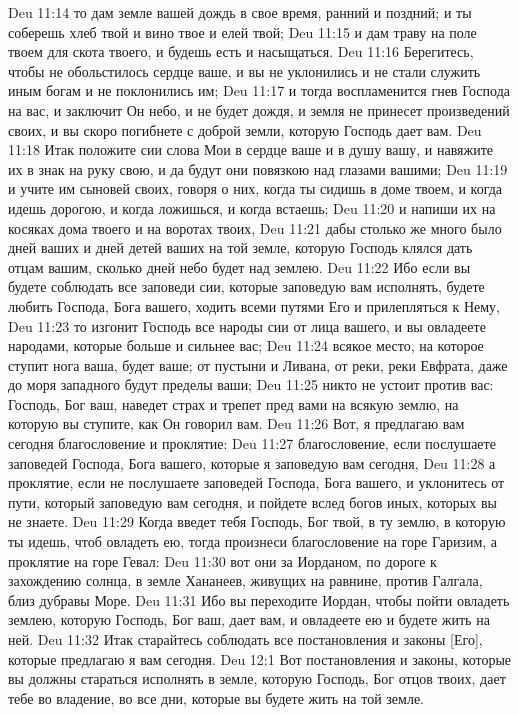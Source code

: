 Deu 11:14  то дам земле вашей дождь в свое время, ранний и поздний; и ты соберешь хлеб твой и вино твое и елей твой;
Deu 11:15  и дам траву на поле твоем для скота твоего, и будешь есть и насыщаться.
Deu 11:16  Берегитесь, чтобы не обольстилось сердце ваше, и вы не уклонились и не стали служить иным богам и не поклонились им;
Deu 11:17  и тогда воспламенится гнев Господа на вас, и заключит Он небо, и не будет дождя, и земля не принесет произведений своих, и вы скоро погибнете с доброй земли, которую Господь дает вам.
Deu 11:18  Итак положите сии слова Мои в сердце ваше и в душу вашу, и навяжите их в знак на руку свою, и да будут они повязкою над глазами вашими;
Deu 11:19  и учите им сыновей своих, говоря о них, когда ты сидишь в доме твоем, и когда идешь дорогою, и когда ложишься, и когда встаешь;
Deu 11:20  и напиши их на косяках дома твоего и на воротах твоих,
Deu 11:21  дабы столько же много было дней ваших и дней детей ваших на той земле, которую Господь клялся дать отцам вашим, сколько дней небо будет над землею.
Deu 11:22  Ибо если вы будете соблюдать все заповеди сии, которые заповедую вам исполнять, будете любить Господа, Бога вашего, ходить всеми путями Его и прилепляться к Нему,
Deu 11:23  то изгонит Господь все народы сии от лица вашего, и вы овладеете народами, которые больше и сильнее вас;
Deu 11:24  всякое место, на которое ступит нога ваша, будет ваше; от пустыни и Ливана, от реки, реки Евфрата, даже до моря западного будут пределы ваши;
Deu 11:25  никто не устоит против вас: Господь, Бог ваш, наведет страх и трепет пред вами на всякую землю, на которую вы ступите, как Он говорил вам.
Deu 11:26  Вот, я предлагаю вам сегодня благословение и проклятие:
Deu 11:27  благословение, если послушаете заповедей Господа, Бога вашего, которые я заповедую вам сегодня,
Deu 11:28  а проклятие, если не послушаете заповедей Господа, Бога вашего, и уклонитесь от пути, который заповедую вам сегодня, и пойдете вслед богов иных, которых вы не знаете.
Deu 11:29  Когда введет тебя Господь, Бог твой, в ту землю, в которую ты идешь, чтоб овладеть ею, тогда произнеси благословение на горе Гаризим, а проклятие на горе Гевал:
Deu 11:30  вот они за Иорданом, по дороге к захождению солнца, в земле Хананеев, живущих на равнине, против Галгала, близ дубравы Море.
Deu 11:31  Ибо вы переходите Иордан, чтобы пойти овладеть землею, которую Господь, Бог ваш, дает вам, и овладеете ею и будете жить на ней.
Deu 11:32  Итак старайтесь соблюдать все постановления и законы [Его], которые предлагаю я вам сегодня.
Deu 12:1  Вот постановления и законы, которые вы должны стараться исполнять в земле, которую Господь, Бог отцов твоих, дает тебе во владение, во все дни, которые вы будете жить на той земле.
